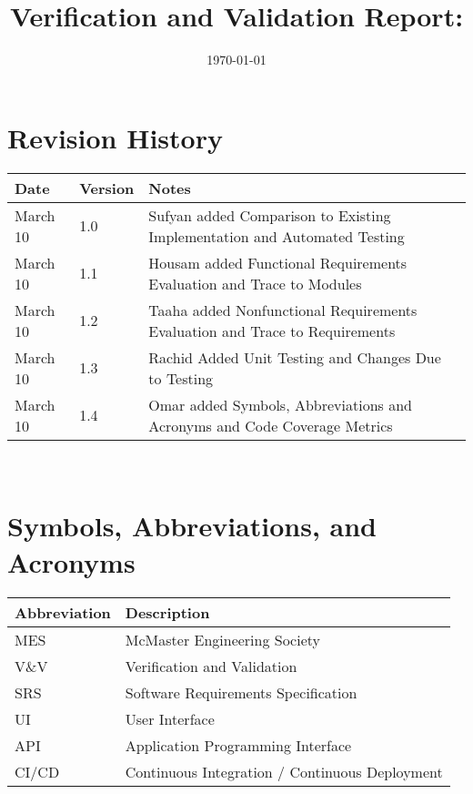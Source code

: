 \documentclass[12pt, titlepage]{article}
\begin{document}
\title{Verification and Validation Report: \progname} 
\author{\authname}
\date{\today}
	
\maketitle


\section{Revision History}

\begin{tabularx}{\textwidth}{p{3cm}p{2cm}X}
\toprule {\bf Date} & {\bf Version} & {\bf Notes}\\
\midrule
March 10 & 1.0 & Sufyan added Comparison to Existing Implementation and Automated Testing\\
March 10 & 1.1 & Housam added Functional Requirements Evaluation and  Trace to Modules\\
March 10 & 1.2 & Taaha added Nonfunctional Requirements Evaluation and Trace to Requirements\\
March 10 & 1.3 & Rachid Added Unit Testing and Changes Due to Testing\\
March 10 & 1.4 & Omar added Symbols, Abbreviations and Acronyms and Code Coverage Metrics\\
\bottomrule
\end{tabularx}

~\newpage

\section{Symbols, Abbreviations, and Acronyms}

\renewcommand{\arraystretch}{1.2}
\begin{tabular}{|p{3cm}|p{10cm}|}
    \hline
    \textbf{Abbreviation} & \textbf{Description} \\
    \hline
    MES & McMaster Engineering Society \\
    \hline
    V\&V & Verification and Validation \\
    \hline
    SRS & Software Requirements Specification \\
    \hline
    UI & User Interface \\
    \hline
    API & Application Programming Interface \\
    \hline
    CI/CD & Continuous Integration / Continuous Deployment \\
    \hline
\end{tabular}
\end{document}
